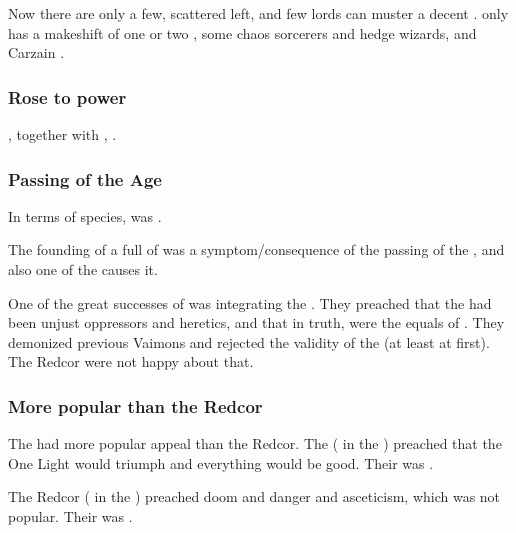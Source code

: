 Now there are only a few, scattered \Telcras{} left, and few lords can muster a decent \ishrah. \Malcur only has a makeshift \ishrah{} of one or two \Telcras, some chaos sorcerers and hedge wizards, and Carzain \Shireyo. 





\subsubsection{Rose to power}
\Tepharae, together with , .





\subsubsection{Passing of the \Human Age}
In terms of species, \Telcra{} was . 

The founding of a \VaimonClan full of \scathae{} was a symptom/consequence of the passing of the , and also one of the causes it. 

One of the great successes of \ClanTelcra was integrating the \scathae. 
They preached that the  had been unjust oppressors and heretics, and that in truth, \scathae were the equals of \humans. 
They demonized previous Vaimons and rejected the validity of the \caliphate (at least at first).
The Redcor were not happy about that. 




\subsubsection{More popular than the Redcor}
The \Telcras had more popular appeal than the Redcor.
The \Telcras ( in the ) preached that the One Light would triumph and everything would be good.
Their \iquin was . 

The Redcor ( in the ) preached doom and danger and asceticism, which was not popular. 
Their \iquin was . 

